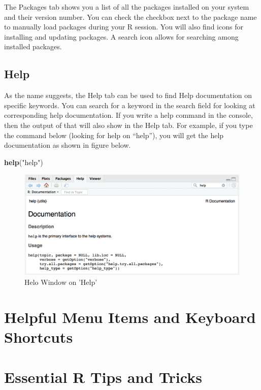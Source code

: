 \documentclass[]{krantz}
\makeatletter
\newenvironment{Shaded}{\begin{snugshade}}{\end{snugshade}}
\newcommand{\KeywordTok}[1]{\textcolor[rgb]{0.27,0.27,0.27}{\textbf{#1}}}
\newcommand{\StringTok}[1]{\textcolor[rgb]{0.5,0.5,0.5}{#1}}
\newcommand{\NormalTok}[1]{#1}
\newenvironment{kframe}{%
\medskip{}
\setlength{\fboxsep}{.8em}
 \def\at@end@of@kframe{}%
 \ifinner\ifhmode%
  \def\at@end@of@kframe{\end{minipage}}%
  \begin{minipage}{\columnwidth}%
 \fi\fi%
 \def\FrameCommand##1{\hskip\@totalleftmargin \hskip-\fboxsep
 \colorbox{shadecolor}{##1}\hskip-\fboxsep
     \hskip-\linewidth \hskip-\@totalleftmargin \hskip\columnwidth}%
 \MakeFramed {\advance\hsize-\width
   \@totalleftmargin\z@ \linewidth\hsize
   \@setminipage}}%
 {\par\unskip\endMakeFramed%
 \at@end@of@kframe}
\renewenvironment{Shaded}{\begin{kframe}}{\end{kframe}}
\theoremstyle{definition}
\theoremstyle{definition}
\theoremstyle{definition}
\theoremstyle{remark}
\makeatother
\begin{document}
The Packages tab shows you a list of all the packages installed on your
system and their version number. You can check the checkbox next to the
package name to manually load packages during your R session. You will
also find icons for installing and updating packages. A search icon
allows for searching among installed packages.

\subsection{Help}\label{help}

As the name suggests, the Help tab can be used to find Help
documentation on specific keywords. You can search for a keyword in the
search field for looking at corresponding help documentation. If you
write a help command in the console, then the output of that will also
show in the Help tab. For example, if you type the command below
(looking for help on ``help''), you will get the help documentation as
shown in figure below.

\begin{Shaded}
\begin{Highlighting}[]
\KeywordTok{help}\NormalTok{(}\StringTok{"help"}\NormalTok{)}
\end{Highlighting}
\end{Shaded}

\begin{figure}

{\centering \includegraphics[width=0.5\linewidth]{images/help} 

}

\caption{Helo Window on 'Help'}\label{fig:unnamed-chunk-9}
\end{figure}

\section{Helpful Menu Items and Keyboard
Shortcuts}\label{helpful-menu-items-and-keyboard-shortcuts}

\section{Essential R Tips and Tricks}\label{essential-r-tips-and-tricks}
\end{document}
